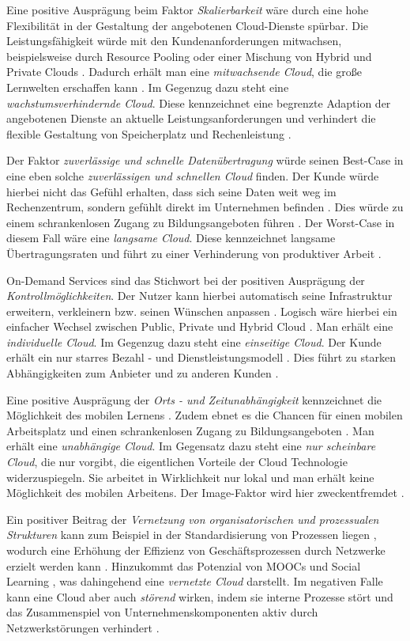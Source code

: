 Eine positive Ausprägung beim Faktor \textit{Skalierbarkeit} wäre durch eine hohe Flexibilität in der Gestaltung der angebotenen Cloud-Dienste spürbar. Die Leistungsfähigkeit würde mit den Kundenanforderungen mitwachsen, beispielsweise durch Resource Pooling oder einer Mischung von Hybrid und Private Clouds \cite{renz}. Dadurch erhält man eine \textit{mitwachsende Cloud}, die große Lernwelten erschaffen kann \cite{almajalid}. Im Gegenzug dazu steht eine \textit{wachstumsverhindernde Cloud}. Diese kennzeichnet eine begrenzte Adaption der angebotenen Dienste an aktuelle Leistungsanforderungen und verhindert die flexible Gestaltung von Speicherplatz und Rechenleistung \cite{gebauer}.

Der Faktor \textit{zuverlässige und schnelle Datenübertragung} würde seinen Best-Case in eine eben solche \textit{zuverlässigen und schnellen Cloud} finden. Der Kunde würde hierbei nicht das Gefühl erhalten, dass sich seine Daten weit weg im Rechenzentrum, sondern gefühlt direkt im Unternehmen befinden \cite{almajalid}. Dies würde zu einem schrankenlosen Zugang zu Bildungsangeboten führen \cite{meinel}. Der Worst-Case in diesem Fall wäre eine \textit{langsame Cloud}. Diese kennzeichnet langsame Übertragungsraten und führt zu einer Verhinderung von produktiver Arbeit \cite{gebauer}.

On-Demand Services sind das Stichwort bei der positiven Ausprägung der \textit{Kontrollmöglichkeiten}. Der Nutzer kann hierbei automatisch seine Infrastruktur erweitern, verkleinern bzw. seinen Wünschen anpassen \cite{stieninger}. Logisch wäre hierbei ein einfacher Wechsel zwischen Public, Private und Hybrid Cloud \cite{alabbadi}. Man erhält eine \textit{individuelle Cloud}. Im Gegenzug dazu steht eine \textit{einseitige Cloud}. Der Kunde erhält ein nur starres Bezahl - und Dienstleistungsmodell \cite{stieninger}. Dies führt zu starken Abhängigkeiten zum Anbieter und zu anderen Kunden \cite{gebauer}.

Eine positive Ausprägung der \textit{Orts - und Zeitunabhängigkeit} kennzeichnet die Möglichkeit des mobilen Lernens \cite{specht}. Zudem ebnet es die Chancen für einen mobilen Arbeitsplatz und einen schrankenlosen Zugang zu Bildungsangeboten \cite{meinel}. Man erhält eine \textit{unabhängige Cloud}. Im Gegensatz dazu steht eine \textit{nur scheinbare Cloud}, die nur vorgibt, die eigentlichen Vorteile der Cloud Technologie widerzuspiegeln. Sie arbeitet in Wirklichkeit nur lokal und man erhält keine Möglichkeit des mobilen Arbeitens. Der Image-Faktor wird hier zweckentfremdet \cite{gebauer}.

Ein positiver Beitrag der \textit{Vernetzung von organisatorischen und prozessualen Strukturen} kann zum Beispiel in der Standardisierung von Prozessen liegen \cite{krcmar}, wodurch eine Erhöhung der Effizienz von Geschäftsprozessen durch Netzwerke erzielt werden kann \cite{schweizer}. Hinzukommt das Potenzial von MOOCs und Social Learning \cite{goertz}, was dahingehend eine \textit{vernetzte Cloud} darstellt. Im negativen Falle kann eine Cloud aber auch \textit{störend} wirken, indem sie interne Prozesse stört und das Zusammenspiel von Unternehmenskomponenten aktiv durch Netzwerkstörungen verhindert \cite{gebauer}.
